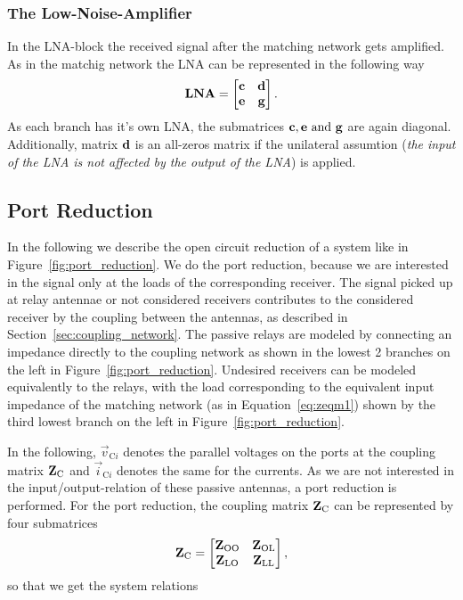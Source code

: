 \subsubsection{The Low-Noise-Amplifier}
\label{sec:lna}
In the LNA-block the received signal after the matching network gets amplified.
As in the matchig network the LNA can be represented in the following way
\begin{equation}
\mathbf{LNA}=
\begin{bmatrix}
\mathbf{c} & \mathbf{d} \\
\mathbf{e} & \mathbf{g}
\end{bmatrix}.
\end{equation}
As each branch has it's own LNA, the submatrices $\mathbf{c},\mathbf{e}\text{ and }\mathbf{g}$ are again diagonal.
Additionally, matrix $\mathbf{d}$ is an all-zeros matrix if the unilateral assumtion (\textit{the input of the LNA is not affected by the output of the LNA}) is applied.




\subsection{Port Reduction}
\label{sec:port_reduction}

In the following we describe the open circuit reduction of a system like in Figure~\ref{fig:port_reduction}.
We do the port reduction, because we are interested in the signal only at the loads of the corresponding receiver.
The signal picked up at relay antennae or not considered receivers contributes to the considered receiver by the coupling between the antennas, as described in Section~\ref{sec:coupling_network}.
The passive relays are modeled by connecting an impedance directly to the coupling network as shown in the lowest 2 branches on the left in Figure~\ref{fig:port_reduction}.
Undesired receivers can be modeled equivalently to the relays, with the load corresponding to the equivalent input impedance of the matching network (as in Equation~\eqref{eq:zeqm1}) shown by the third lowest branch on the left in Figure~\ref{fig:port_reduction}.

In the following, $\vec{v}_{\text{C}i}$ denotes the parallel voltages on the ports at the coupling matrix $\mathbf{Z}_\text{C}$ and $\vec{i}_{\text{C}i}$ denotes the same for the currents.
As we are not interested in the input/output-relation of these passive antennas, a port reduction is performed.
For the port reduction, the coupling matrix $\mathbf{Z}_\text{C}$ can be represented by four submatrices
\begin{equation}
\mathbf{Z}_\text{C}=
\begin{bmatrix}
\mathbf{Z}_\text{OO} & \mathbf{Z}_\text{OL}\\
\mathbf{Z}_\text{LO} & \mathbf{Z}_\text{LL}
\end{bmatrix},
\end{equation}
so that we get the system relations

